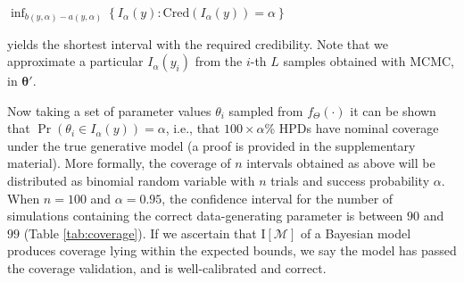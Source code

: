 \documentclass[oneside]{article}
\begin{document}
\begin{center}
  \hspace{0cm}
  $\inf_{b(y, \alpha)-a(y, \alpha)} \left \{ I_\alpha(y) : \text{Cred}(I_\alpha(y)) = \alpha \right\}$
\end{center}



\noindent yields the shortest interval with the required credibility.
Note that we approximate a particular $I_\alpha(y_i)$ from the $i$-th $L$ samples obtained with MCMC, in $\boldsymbol{\theta}'$.

Now taking a set of parameter values $\theta_i$ sampled from $f_\Theta(\cdot)$
it can be shown that
$\operatorname{Pr}\left(\theta_i \in I_\alpha(y) \right) = \alpha$, i.e., that $100\times\alpha$\% HPDs have nominal coverage under the true generative model (a proof is provided in the supplementary material).
More formally, the coverage of $n$ intervals obtained as above will be distributed as binomial random variable with $n$ trials and success probability $\alpha$.
When $n=100$ and $\alpha = 0.95$, the confidence interval for the number of simulations containing the correct data-generating parameter is between $90$ and $99$ (Table \ref{tab:coverage}).
If we ascertain that $\text{I}[\mathcal{M}]$ of a Bayesian model produces coverage lying within the expected bounds, we say the model has passed the coverage validation, and is well-calibrated and correct.

%   
\end{document}
